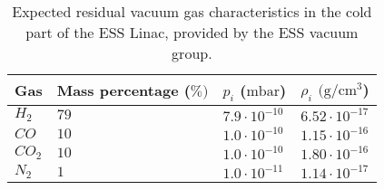 \begin{table}[ht]
	\centering
	\caption[Expected residual vacuum gas characteristics in the cold part of the ESS Linac, provided by the ESS vacuum group]
	{Expected residual vacuum gas characteristics in the cold part of the ESS Linac, provided by the ESS vacuum group.}
	\label{chap3:ess_vacuum_gas}
	\begin{tabularx}{\linewidth}{XlXX}
		\toprule
		Gas        & Mass percentage (\(\%)\) & $p_{i}$ (\(\mathrm{mbar}\)) & $\rho_{i}$ $(\mathrm{g/cm^{3}}$) \\
		\midrule
		\(H_{2}\)  & \(79\)                   & \(7.9\cdot10^{-10}\)        & \(6.52\cdot
		10^{-17}\)                                                                                             \\
		\(CO\)     & \(10\)                   & \(1.0\cdot10^{-10}\)        & \(1.15\cdot
		10^{-16}\)                                                                                             \\
		\(CO_{2}\) & \(10\)                   & \(1.0\cdot10^{-10}\)        & \(1.80\cdot
		10^{-16}\)                                                                                             \\
		\(N_{2}\)  & \(1\)                    & \(1.0\cdot10^{-11}\)        & \(1.14\cdot
		10^{-17}\)                                                                                             \\
		\bottomrule
	\end{tabularx}
\end{table}